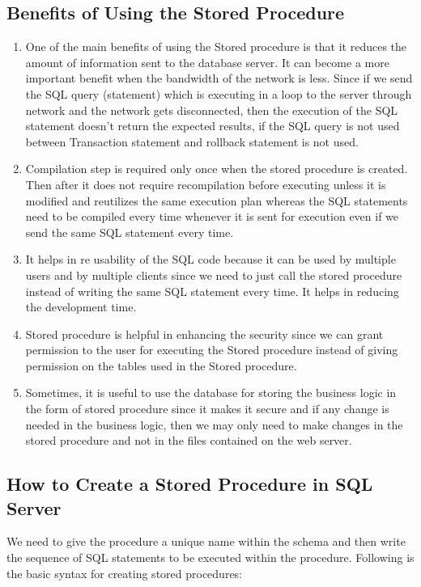 \subsection{Benefits of Using the Stored Procedure}

\begin{enumerate}
\item One of the main benefits of using the Stored procedure is that it reduces the amount of information sent to the database server. It can become a more important benefit when the bandwidth of the network is less. Since if we send the SQL query (statement) which is executing in a loop to the server through network and the network gets disconnected, then the execution of the SQL statement doesn't return the expected results, if the SQL query is not used between Transaction statement and rollback statement is not used.
\item Compilation step is required only once when the stored procedure is created. Then after it does not require recompilation before executing unless it is modified and reutilizes the same execution plan whereas the SQL statements need to be compiled every time whenever it is sent for execution even if we send the same SQL statement every time.
\item It helps in re usability of the SQL code because it can be used by multiple users and by multiple clients since we need to just call the stored procedure instead of writing the same SQL statement every time. It helps in reducing the development time.
\item Stored procedure is helpful in enhancing the security since we can grant permission to the user for executing the Stored procedure instead of giving permission on the tables used in the Stored procedure.
\item Sometimes, it is useful to use the database for storing the business logic in the form of stored procedure since it makes it secure and if any change is needed in the business logic, then we may only need to make changes in the stored procedure and not in the files contained on the web server.
\end{enumerate}

\subsection{How to Create a Stored Procedure in SQL Server}
We need to give the procedure a unique name within the schema and then write the sequence of SQL statements to be executed within the procedure. Following is the basic syntax for creating stored procedures:


